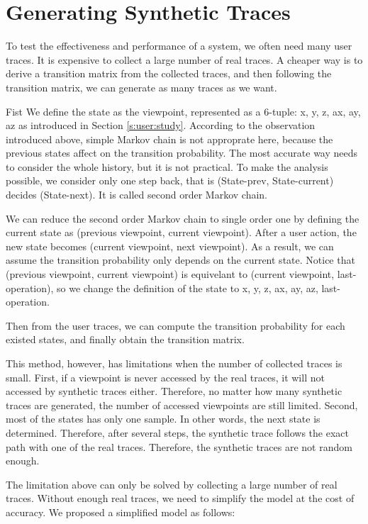 \section{Generating Synthetic Traces}
To test the effectiveness and performance of a system, we often need many user traces. It is expensive to collect a large number 
of real traces. A cheaper way is to derive a transition matrix from the collected traces, and then following the transition
matrix, we can generate as many traces as we want.

Fist We define the state as the viewpoint, represented as a 6-tuple: {x, y, z, ax, ay, az}
as introduced in Section \ref{s:user:study}.
According to the observation introduced above, simple Markov chain is not approprate here, because
the previous states affect on the transition probability. The most accurate way needs to consider the whole
history, but it is not practical. To make the analysis possible, we consider only one step back, 
that is (State-prev, State-current) decides (State-next). It is called second order Markov chain. 

We can reduce the second order Markov chain to single order one by defining the current state as
(previous viewpoint, current viewpoint). After a user action, the new state becomes
(current viewpoint, next viewpoint). As a result, we can assume the transition probability
only depends on the current state.
Notice that (previous viewpoint, current viewpoint) is equivelant to (current viewpoint, last-operation), 
so we change the definition of the state to {x, y, z, ax, ay, az, last-operation}. 

Then from the user traces, we can compute the transition probability for each existed states, and finally
obtain the transition matrix. 

This method, however, has limitations when the number of collected traces is small. First, if a viewpoint is 
never accessed by the real traces, it will not accessed by synthetic traces either. Therefore, no matter how
many synthetic traces are generated, the number of accessed viewpoints are still limited. Second, most of the
states has only one sample. In other words, the next state is determined. Therefore, after several steps, the
synthetic trace follows the exact path with one of the real traces. Therefore, the synthetic traces are not 
random enough.

The limitation above can only be solved by collecting a large number of real traces. Without enough real traces,
we need to simplify the model at the cost of accuracy. We proposed a simplified model as follows:
